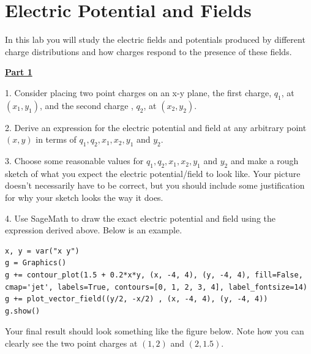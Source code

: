 \section{Electric Potential and Fields}

In this lab you will study the electric fields and potentials produced by different charge distributions and how charges respond to the presence of these fields.

\vspace{\baselineskip}

\underline{\textbf{Part 1}} \par
1. Consider placing two point charges on an x-y plane, the first charge, $q_1$, at $(x_1, y_1)$, and the second charge , $q_2$, at $(x_2, y_2)$.

\vspace{\baselineskip}

2. Derive an expression for the electric potential and field at any arbitrary point $(x, y)$ in terms of $q_1, q_2, x_1, x_2, y_1$ and $y_2$.

\vspace{\baselineskip}

3. Choose some reasonable values for $q_1, q_2, x_1, x_2, y_1$ and $y_2$ and make a rough sketch of what you expect the electric potential/field to look like.
Your picture doesn't necessarily have to be correct, but you should include some justification for why your sketch looks the way it does.

\vspace{\baselineskip}

4. Use SageMath to draw the exact electric potential and field using the expression derived above.
Below is an example.

\begin{verbatim}
x, y = var("x y")
g = Graphics()
g += contour_plot(1.5 + 0.2*x*y, (x, -4, 4), (y, -4, 4), fill=False, cmap='jet', labels=True, contours=[0, 1, 2, 3, 4], label_fontsize=14)
g += plot_vector_field((y/2, -x/2) , (x, -4, 4), (y, -4, 4)) 
g.show()
\end{verbatim}

Your final result should look something like the figure below.
Note how you can clearly see the two point charges at $(1, 2)$ and $(2, 1.5)$.

